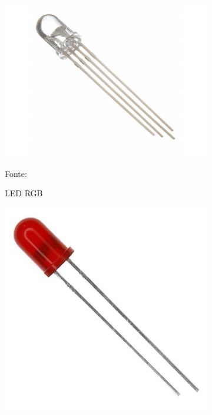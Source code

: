\begin{figure}[h!]
\centering
  \begin{subfigure}[b]{0.3\textwidth}
  \centering
    \includegraphics[width=\textwidth]{figuras/led_rgb.jpg}
    \caption{LED RGB} Fonte: \cite{Elcoteam2019}
    \label{fig:led_rgb}
  \end{subfigure}
  \begin{subfigure}[b]{0.22\textwidth}
  \centering
    \includegraphics[width=\textwidth]{figuras/led_difuso.jpg}

\end{subfigure}
\end{figure}
